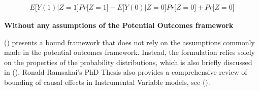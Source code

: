 \documentclass{article}
\begin{document}
\begin{equation*}
\begin{split}
E{[}Y(1)| Z=1{]}Pr{[}Z=1{]} -
E{[}Y(0)| Z=0{]}Pr{[}Z=0{]} + Pr{[}Z=0{]}
\end{split}
\end{equation*}


\textbf{Without any assumptions of the Potential Outcomes
framework}
\label{without-any-assumptions-of-the-potential-outcomes-framework}

(\cite{ramsahai2012causal}) presents a bound framework that does not rely on the
assumptions commonly made in the potential outcomes framework. Instead,
the formulation relies solely on the properties of the probability
distributions, which is also briefly discussed in (\cite{manski1990nonparametric}).
Ronald Ramsahai's PhD Thesis also provides a comprehensive review of
bounding of causal effects in Instrumental Variable models, see (\cite{ramsahai2012causal}).


\printbibliography
\end{document}
